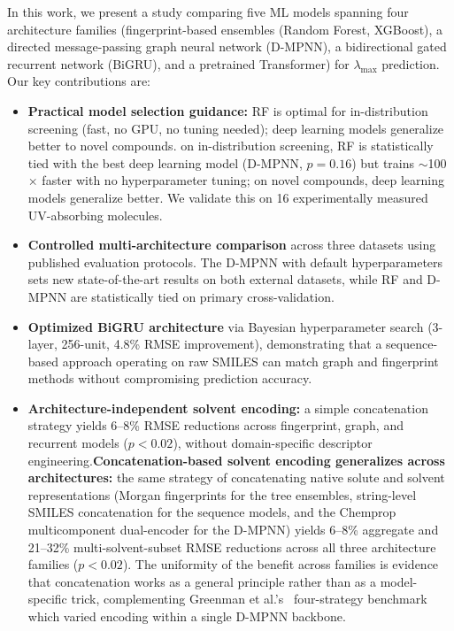 \documentclass[journal=jcisd8,manuscript=article]{achemso}
\newcommand{\added}[1]{{\color{addedblue}#1}}
\newcommand{\removed}[1]{{\color{removedred}#1}}
\begin{document}
In this work, we present a study comparing five ML models spanning four architecture families (fingerprint-based ensembles (Random Forest, XGBoost), a directed message-passing graph neural network (D-MPNN), a bidirectional gated recurrent network (BiGRU), and a pretrained Transformer) for $\lambda_{\max}$ prediction.
Our key contributions are:
\begin{itemize}
 \item \textbf{Practical model selection guidance:} \removed{RF is optimal for in-distribution screening (fast, no GPU, no tuning needed); deep learning models generalize better to novel compounds.} \added{on in-distribution screening, RF is statistically tied with the best deep learning model (D-MPNN, $p = 0.16$) but trains $\sim$100$\times$ faster with no hyperparameter tuning; on novel compounds, deep learning models generalize better.} We validate this on 16 experimentally measured UV-absorbing molecules.
 \item \textbf{Controlled multi-architecture comparison} across three datasets using published evaluation protocols. The D-MPNN with default hyperparameters sets new state-of-the-art results on both external datasets, while RF and D-MPNN are statistically tied on primary cross-validation.
 \item \textbf{Optimized BiGRU architecture} via Bayesian hyperparameter search (3-layer, 256-unit, 4.8\% RMSE improvement), demonstrating that a sequence-based approach operating on raw SMILES can match graph and fingerprint methods without compromising prediction accuracy.
 \item \removed{\textbf{Architecture-independent solvent encoding:} a simple concatenation strategy yields 6--8\% RMSE reductions across fingerprint, graph, and recurrent models ($p < 0.02$), without domain-specific descriptor engineering.}\added{\textbf{Concatenation-based solvent encoding generalizes across architectures:} the same strategy of concatenating native solute and solvent representations (Morgan fingerprints for the tree ensembles, string-level SMILES concatenation for the sequence models, and the Chemprop multicomponent dual-encoder for the D-MPNN) yields 6--8\% aggregate and 21--32\% multi-solvent-subset RMSE reductions across all three architecture families ($p < 0.02$). The uniformity of the benefit across families is evidence that concatenation works as a general principle rather than as a model-specific trick, complementing Greenman et al.'s~\cite{greenman2022multifidelity} four-strategy benchmark which varied encoding within a single D-MPNN backbone.}

\end{itemize}
\end{document}
